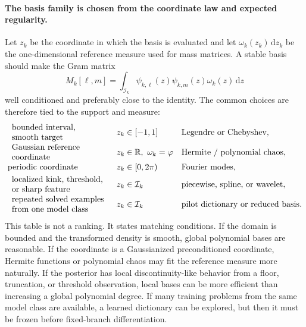 \documentclass[11pt]{article}
\numberwithin{equation}{section}
\newcommand{\R}{\mathbb R}
\newcommand{\dd}{\,\mathrm d}
\begin{document}
\paragraph{The basis family is chosen from the coordinate law and expected
regularity.}
Let \(z_k\) be the coordinate in which the basis is evaluated and let
\(\omega_k(z_k)\dd z_k\) be the one-dimensional reference measure used for
mass matrices.  A stable basis should make the Gram matrix
\begin{equation}
    M_k[\ell,m]
    =
    \int_{\mathcal I_k}
    \psi_{k,\ell}(z)\psi_{k,m}(z)\omega_k(z)\dd z
    \label{eq:p30-basis-gram}
\end{equation}
well conditioned and preferably close to the identity.  The common choices are
therefore tied to the support and measure:
\begin{equation}
\begin{array}{@{}lll@{}}
\begin{array}{l}\text{bounded interval,}\\ \text{smooth target}\end{array} &
    z_k\in[-1,1] &
    \text{Legendre or Chebyshev},\\[1mm]
\begin{array}{l}\text{Gaussian reference}\\ \text{coordinate}\end{array} &
    z_k\in\R,\ \omega_k=\varphi &
    \text{Hermite / polynomial chaos},\\[1mm]
\text{periodic coordinate} &
    z_k\in[0,2\pi) &
    \text{Fourier modes},\\[1mm]
\begin{array}{l}\text{localized kink, threshold,}\\ \text{or sharp feature}\end{array} &
    z_k\in\mathcal I_k &
    \text{piecewise, spline, or wavelet},\\[1mm]
\begin{array}{l}\text{repeated solved examples}\\ \text{from one model class}\end{array} &
    z_k\in\mathcal I_k &
    \text{pilot dictionary or reduced basis}.
\end{array}
    \label{eq:p30-basis-table}
\end{equation}
This table is not a ranking.  It states matching conditions.  If the domain is
bounded and the transformed density is smooth, global polynomial bases are
reasonable.  If the coordinate is a Gaussianized preconditioned coordinate,
Hermite functions or polynomial chaos may fit the reference measure more
naturally.  If the posterior has local discontinuity-like behavior from a
floor, truncation, or threshold observation, local bases can be more efficient
than increasing a global polynomial degree.  If many training problems from
the same model class are available, a learned dictionary can be explored, but
then it must be frozen before fixed-branch differentiation.
\end{document}
